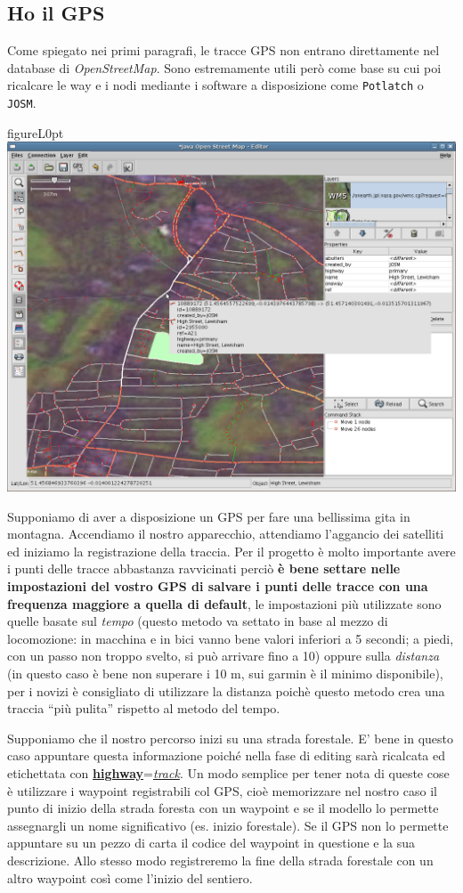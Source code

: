 \documentclass[a4paper,twoside,12pt,]{article}
\newcommand{\osm}{\emph{OpenStreetMap\xspace}}
\newcommand{\gps}{GPS\xspace}
\newcommand{\key}[1]{\underline{\textbf{#1}}}
\newcommand{\val}[1]{\underline{\textit{#1}}}
\begin{document}
\subsection{Ho il \gps}
Come spiegato nei primi paragrafi, le tracce \gps non entrano direttamente nel database di \osm. Sono estremamente utili però come base su cui poi ricalcare le way e i nodi mediante i software a disposizione come \texttt{Potlatch} o \texttt{JOSM}.
\begin{wrapfloat}{figure}{L}{0pt}
 \includegraphics[width=0.6\columnwidth]{Josm-screenshot.png}
 \caption{\textit{L'interfaccia di JOSM}}
\end{wrapfloat}
Supponiamo di aver a disposizione un \gps per fare una bellissima gita in montagna. Accendiamo il nostro apparecchio, attendiamo l'aggancio dei satelliti ed iniziamo la registrazione della traccia. Per il progetto è molto importante avere i punti delle tracce abbastanza ravvicinati perciò \textbf{è bene settare nelle impostazioni del vostro \gps di salvare i punti delle tracce con una frequenza maggiore a quella di default}, le impostazioni più utilizzate sono quelle basate sul \textit{tempo} (questo metodo va settato in base al mezzo di locomozione: in macchina e in bici vanno bene valori inferiori a 5 secondi; a piedi, con un passo non troppo svelto, si può arrivare fino a 10) oppure sulla \textit{distanza} (in questo caso è bene non superare i 10 m, sui garmin è il minimo disponibile), per i novizi è consigliato di utilizzare la distanza poichè questo metodo crea una traccia ``più pulita'' rispetto al metodo del tempo.

Supponiamo che il nostro percorso inizi su una strada forestale. E' bene in questo caso appuntare questa informazione poiché nella fase di editing sarà ricalcata ed etichettata con \key{highway}=\val{track}. Un modo semplice per tener nota di queste cose è utilizzare i waypoint registrabili col \gps, cioè memorizzare nel nostro caso il punto di inizio della strada foresta con un waypoint e se il modello lo permette assegnargli un nome significativo (es. inizio forestale). Se il \gps non lo permette appuntare su un pezzo di carta il codice del waypoint in questione e la sua descrizione. Allo stesso modo registreremo la fine della strada forestale con un altro waypoint così come l'inizio del sentiero.
\end{document}
